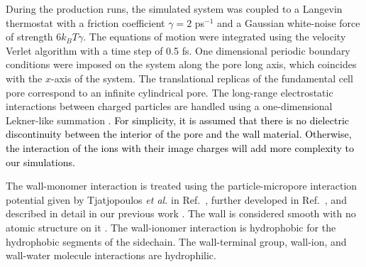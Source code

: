 \documentclass[3p,english,preprint]{elsarticle}
\newcommand{\need}[1]{\textcolor{black}{#1}}
\newcommand{\mage}[1]{\textcolor{black}{#1}}
\begin{document}
During  the production runs, the simulated system was
 coupled  to a Langevin thermostat with a friction coefficient
$\gamma=2 $ ps$^{-1}$ and a Gaussian white-noise force of strength
$6k_{B}T\gamma$.  The equations of motion were
 integrated using the velocity Verlet algorithm with a time step of
 0.5 fs. One dimensional periodic  boundary conditions were 
 imposed on the system along the pore long axis, which coincides with the 
$x$-axis of the system. The  translational 
replicas of the fundamental cell pore correspond to an infinite cylindrical 
pore. 
The long-range electrostatic interactions between charged particles are handled using a one-dimensional 
Lekner-like summation
 \cite{paul-paddison-2005-pore,montoro-abascal-1998-1D-ewalds,mazar,gronbech-jensen-1d-lekner-1997}. 
{\need{ 
For simplicity, it is assumed that there is no dielectric discontinuity between the interior of the pore 
 and the wall material. Otherwise, the interaction of the ions with their 
image charges will add more complexity to our simulations. 
 }}


The wall-monomer interaction is treated using the particle-micropore interaction potential 
given by Tjatjopoulos {\it et al.} in Ref.~\cite{ion-pore-LJ-interaction}, 
further developed in Ref.~\cite{tang-2001}, and described in detail in our previous 
work \cite{allahyarov-2015}. The wall is considered smooth with  no atomic structure on it
\cite{kim-2006}. 
 The wall-ionomer interaction is hydrophobic for the hydrophobic segments of the  sidechain.  
The wall-terminal group, wall-ion, and wall-water molecule   interactions  are hydrophilic. 
\end{document}
